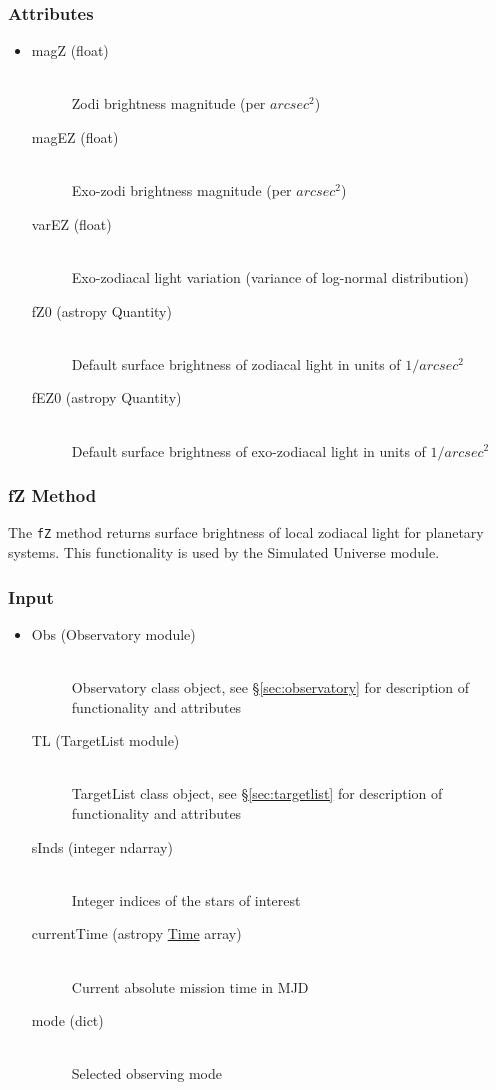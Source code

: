 \documentclass[cleanfoot]{asme2ej}
\begin{document}
\subsubsection*{Attributes}
\begin{itemize}
\item
\begin{description}
    \item[magZ (float)] \hfill \\ Zodi brightness magnitude (per $ arcsec^2 $)
    \item[magEZ (float)] \hfill \\ Exo-zodi brightness magnitude (per $ arcsec^2 $)
    \item[varEZ (float)] \hfill \\ Exo-zodiacal light variation (variance of log-normal distribution)
    \item[fZ0 (astropy Quantity)] \hfill \\ Default surface brightness of zodiacal light in units of $ 1/arcsec^2 $ 
    \item[fEZ0 (astropy Quantity)] \hfill \\ Default surface brightness of exo-zodiacal light in units of $ 1/arcsec^2 $ 
\end{description}
\end{itemize}

\subsubsection{fZ Method} \label{sec:fZtask}
The \verb+fZ+ method returns surface brightness of local zodiacal light for planetary systems.  This functionality is used by the Simulated Universe module.

\subsubsection*{Input}
\begin{itemize}
\item 
\begin{description}
    \item[Obs (Observatory module)] \hfill \\ Observatory class object, see \S\ref{sec:observatory} for description of functionality and attributes       
    \item[TL (TargetList module)] \hfill \\ TargetList class object, see \S\ref{sec:targetlist} for description of functionality and attributes       
    \item[sInds (integer ndarray)] \hfill \\ Integer indices of the stars of interest
    \item[currentTime (astropy \href{http://astropy.readthedocs.org/en/latest/time/index.html}{Time} array)] \hfill \\ Current absolute mission time in MJD    
    \item[mode (dict)] \hfill \\ Selected observing mode
\end{description}
\end{itemize}
\end{document}
